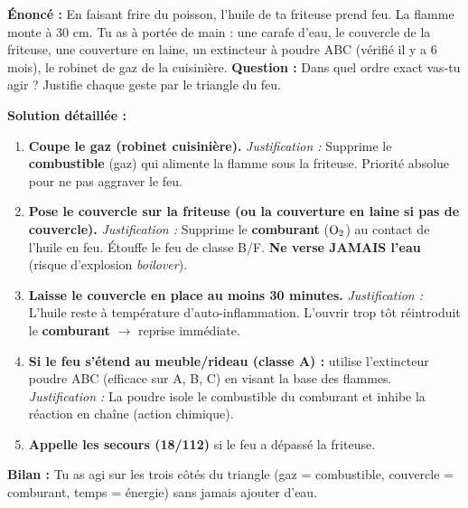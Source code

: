 \documentclass[11pt]{article}
\begin{document}
\begin{exoresolu}
\textbf{Énoncé :} En faisant frire du poisson, l'huile de ta friteuse prend feu. La flamme monte à 30 cm. Tu as à portée de main : une carafe d'eau, le couvercle de la friteuse, une couverture en laine, un extincteur à poudre ABC (vérifié il y a 6 mois), le robinet de gaz de la cuisinière.
\textbf{Question :} Dans quel ordre exact vas-tu agir ? Justifie chaque geste par le triangle du feu.

\tcblower

\textbf{Solution détaillée :}
\begin{enumerate}
    \item \textbf{Coupe le gaz (robinet cuisinière).} \emph{Justification :} Supprime le \textbf{combustible} (gaz) qui alimente la flamme sous la friteuse. Priorité absolue pour ne pas aggraver le feu.
    \item \textbf{Pose le couvercle sur la friteuse (ou la couverture en laine si pas de couvercle).} \emph{Justification :} Supprime le \textbf{comburant} ($\ce{O2}$) au contact de l'huile en feu. Étouffe le feu de classe B/F. \textbf{Ne verse JAMAIS l'eau} (risque d'explosion \emph{boilover}).
    \item \textbf{Laisse le couvercle en place au moins 30 minutes.} \emph{Justification :} L'huile reste à température d'auto-inflammation. L'ouvrir trop tôt réintroduit le \textbf{comburant} $\to$ reprise immédiate.
    \item \textbf{Si le feu s'étend au meuble/rideau (classe A) :} utilise l'extincteur poudre ABC (efficace sur A, B, C) en visant la base des flammes. \emph{Justification :} La poudre isole le combustible du comburant et inhibe la réaction en chaîne (action chimique).
    \item \textbf{Appelle les secours (18/112)} si le feu a dépassé la friteuse.
\end{enumerate}
\textbf{Bilan :} Tu as agi sur les trois côtés du triangle (gaz = combustible, couvercle = comburant, temps = énergie) sans jamais ajouter d'eau.
\end{exoresolu}
\end{document}
